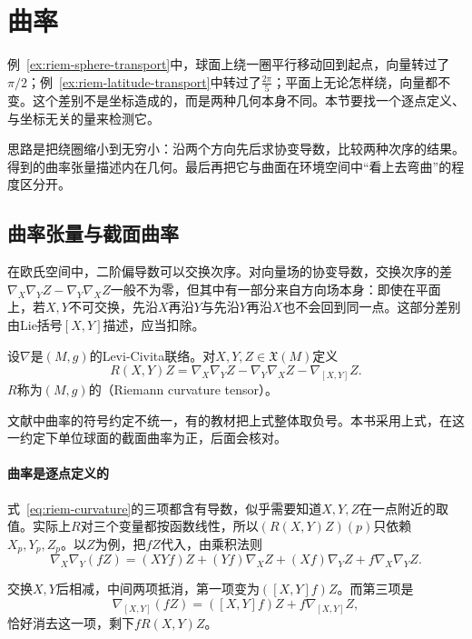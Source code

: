 \section{曲率}
\label{sec:riem-curvature}

例~\ref{ex:riem-sphere-transport}中，球面上绕一圈平行移动回到起点，向量转过了$\pi/2$；例~\ref{ex:riem-latitude-transport}中转过了$\tfrac{2\pi}5$；平面上无论怎样绕，向量都不变。这个差别不是坐标造成的，而是两种几何本身不同。本节要找一个逐点定义、与坐标无关的量来检测它。

思路是把绕圈缩小到无穷小：沿两个方向先后求协变导数，比较两种次序的结果。得到的曲率张量描述内在几何。最后再把它与曲面在环境空间中“看上去弯曲”的程度区分开。

\subsection{曲率张量与截面曲率}
\label{sec:riem-curvature-tensor}

在欧氏空间中，二阶偏导数可以交换次序。对向量场的协变导数，交换次序的差$\nabla_X\nabla_YZ-\nabla_Y\nabla_XZ$一般不为零，但其中有一部分来自方向场本身：即使在平面上，若$X,Y$不可交换，先沿$X$再沿$Y$与先沿$Y$再沿$X$也不会回到同一点。这部分差别由Lie括号$[X,Y]$描述，应当扣除。

\begin{definition}[黎曼曲率张量]
\label{def:riem-curvature-tensor}
设$\nabla$是$(M,g)$的Levi-Civita联络。对$X,Y,Z\in\mathfrak X(M)$定义
\begin{equation}
R(X,Y)Z=\nabla_X\nabla_YZ-\nabla_Y\nabla_XZ-\nabla_{[X,Y]}Z .
\label{eq:riem-curvature}
\end{equation}
$R$称为$(M,g)$的（Riemann curvature tensor）。
\end{definition}

文献中曲率的符号约定不统一，有的教材把上式整体取负号。本书采用上式，在这一约定下单位球面的截面曲率为正，后面会核对。

\paragraph{曲率是逐点定义的}
式~\eqref{eq:riem-curvature}的三项都含有导数，似乎需要知道$X,Y,Z$在一点附近的取值。实际上$R$对三个变量都按函数线性，所以$(R(X,Y)Z)(p)$只依赖$X_p,Y_p,Z_p$。以$Z$为例，把$fZ$代入，由乘积法则
\[
\nabla_X\nabla_Y(fZ)=(XYf)Z+(Yf)\nabla_XZ+(Xf)\nabla_YZ+f\nabla_X\nabla_YZ .
\]

交换$X,Y$后相减，中间两项抵消，第一项变为$([X,Y]f)Z$。而第三项是
\[
\nabla_{[X,Y]}(fZ)=([X,Y]f)Z+f\nabla_{[X,Y]}Z ,
\]
恰好消去这一项，剩下$fR(X,Y)Z$。

